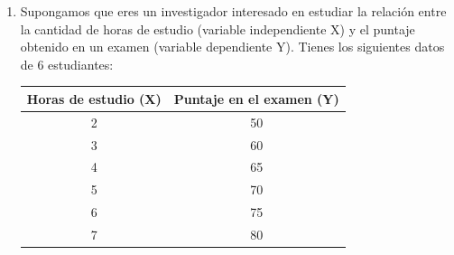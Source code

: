 \documentclass[10pt,a4paper]{article}
\begin{document}
\begin{enumerate}

\item 
Supongamos que eres un investigador interesado en estudiar la relación entre la cantidad de horas de estudio (variable independiente X) y el puntaje obtenido en un examen (variable dependiente Y).
Tienes los siguientes datos de 6 estudiantes:

\begin{table}[h!]
\centering
\begin{tabular}{|c|c|}
\hline
\textbf{Horas de estudio (X)} & \textbf{Puntaje en el examen (Y)} \\
\hline
2 & 50 \\
3 & 60 \\
4 & 65 \\
5 & 70 \\
6 & 75 \\
7 & 80 \\
\hline
\end{tabular}
\label{tabla:estudio_puntaje}
\end{table}


\end{enumerate}
\end{document}
